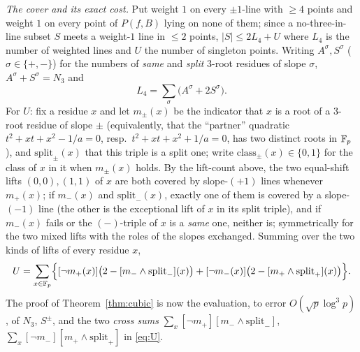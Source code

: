 \smallskip\noindent\emph{The cover and its exact cost.} Put weight $1$ on every $\pm1$-line with $\ge4$ points and
weight $1$ on every point of $P(f,B)$ lying on none of them; since a no-three-in-line subset $S$ meets a weight-$1$
line in $\le2$ points, $|S|\le2L_4+U$ where $L_4$ is the number of weighted lines and $U$ the number of singleton
points. Writing $A^\sigma,S^\sigma$ ($\sigma\in\{+,-\}$) for the numbers of \emph{same} and \emph{split} $3$-root
residues of slope $\sigma$, $A^\sigma+S^\sigma=N_3$ and
\[
L_4=\sum_\sigma\bigl(A^\sigma+2S^\sigma\bigr).
\]
For $U$: fix a residue $x$ and let $m_\pm(x)$ be the indicator that $x$ is a root of a $3$-root residue of slope
$\pm$ (equivalently, that the ``partner'' quadratic $t^2+xt+x^2-1/a=0$, resp.\ $t^2+xt+x^2+1/a=0$, has two distinct
roots in $\mathbb{F}_p$), and $\mathrm{split}_\pm(x)$ that this triple is a split one; write $\mathrm{class}_\pm(x)\in\{0,1\}$
for the class of $x$ in it when $m_\pm(x)$ holds. By the lift-count above, the two equal-shift lifts $(0,0),(1,1)$ of $x$ are both
covered by slope-$(+1)$ lines whenever $m_+(x)$; if $m_-(x)$ and $\mathrm{split}_-(x)$, exactly one of them is covered
by a slope-$(-1)$ line (the other is the exceptional lift of $x$ in its split triple), and if $m_-(x)$ fails or the
$(-)$-triple of $x$ is a \emph{same} one, neither is; symmetrically for the two mixed lifts with the roles of the slopes
exchanged. Summing over the two kinds of lifts of every residue $x$,
\begin{equation}\label{eq:U}
U=\sum_{x\in\mathbb{F}_p}\Bigl\{[\neg m_+(x)]\bigl(2-[m_-\wedge\mathrm{split}_-](x)\bigr)+[\neg m_-(x)]\bigl(2-[m_+\wedge\mathrm{split}_+](x)\bigr)\Bigr\}.
\end{equation}
The proof of Theorem~\ref{thm:cubic} is now the evaluation, to error $O(\sqrt p\log^3p)$, of $N_3$, $S^\pm$, and the
two \emph{cross sums} $\sum_x[\neg m_+][m_-\wedge\mathrm{split}_-]$, $\sum_x[\neg m_-][m_+\wedge\mathrm{split}_+]$
in \eqref{eq:U}.

